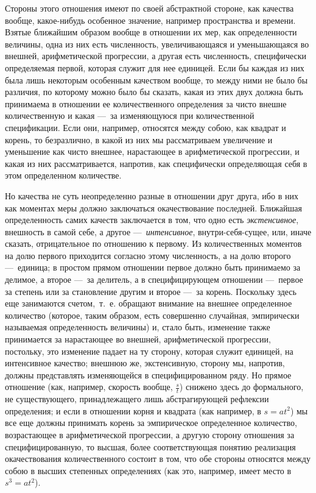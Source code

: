 Стороны этого отношения имеют по своей абстрактной стороне, как качества
вообще, какое-нибудь особенное значение, например пространства и времени.
Взятые ближайшим образом вообще в отношении их мер, как определенности
величины, одна из них есть численность, увеличивающаяся и уменьшающаяся во
внешней, арифметической прогрессии, а другая есть численность, специфически
определяемая первой, которая служит для нее единицей. Если бы каждая из них
была лишь некоторым особенным качеством вообще, то между ними не было бы
различия, по которому можно было бы сказать, какая из этих двух должна быть
принимаема в отношении ее количественного определения за чисто внешне
количественную и какая —~за изменяющуюся при количественной спецификации.
Если они, например, относятся между собою, как квадрат и корень, то
безразлично, в какой из них мы рассматриваем увеличение и уменьшение как
чисто внешнее, нарастающее в арифметической прогрессии, и какая из них
рассматривается, напротив, как специфически определяющая себя в этом
определенном количестве.

Но качества не суть неопределенно разные в отношении друг друга, ибо в них
как моментах меры должно заключаться окачествование последней. Ближайшая
определенность самих качеств заключается в том, что одно есть
{\em экстенсивное}, внешность в самой себе, а другое
—~{\em интенсивное}, внутри-себя-сущее, или, иначе
сказать, отрицательное по отношению к первому. Из количественных моментов
на долю первого приходится согласно этому численность, а на долю второго
—~единица; в простом прямом отношении первое должно быть принимаемо за
делимое, а второе —~за делитель, а в специфицирующем отношении —~первое за
степень или за становление другим и второе —~за корень. Поскольку здесь еще
занимаются счетом,~т.~е. обращают внимание на внешнее определенное
количество (которое, таким образом, есть совершенно случайная, эмпирически
называемая определенность величины) и, стало быть, изменение также
принимается за нарастающее во внешней, арифметической прогрессии,
постольку, это изменение падает на ту сторону, которая служит единицей, на
интенсивное качество; внешнюю же, экстенсивную, сторону мы, напротив,
должны представлять изменяющейся в специфицированном ряду. Но прямое
отношение (как, например, скорость вообще,  $\frac s t$) снижено здесь до
формального, не существующего, принадлежащего лишь абстрагирующей рефлексии
определения; и если в отношении корня и квадрата (как например, в 
$s=at^2$) мы все еще должны принимать корень за эмпирическое определенное
количество, возрастающее в арифметической прогрессии, а другую сторону
отношения за специфицированную, то высшая, более соответствующая понятию
реализация окачествования количественного состоит в том, что обе стороны
относятся между собою в высших степенных определениях (как это, например,
имеет место в  $s^3=at^2$).

